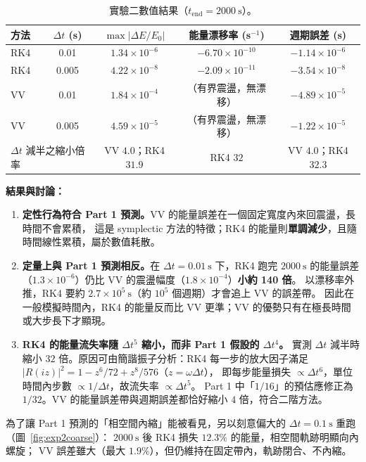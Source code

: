 \documentclass[11pt,a4paper]{article}
\newcommand{\dt}{\Delta t}
\begin{document}
\begin{table}[H]
\centering
\caption{實驗二數值結果（$t_{\text{end}}=2000~\mathrm{s}$）。}
\begin{tabular}{lcccc}
\toprule
方法 & $\dt$ (s) & $\max|\Delta E/E_0|$ & 能量漂移率 (s$^{-1}$) & 週期誤差 (s) \\
\midrule
RK4 & 0.01  & $1.34\times10^{-6}$ & $-6.70\times10^{-10}$ & $-1.14\times10^{-6}$ \\
RK4 & 0.005 & $4.22\times10^{-8}$ & $-2.09\times10^{-11}$ & $-3.54\times10^{-8}$ \\
VV  & 0.01  & $1.84\times10^{-4}$ & （有界震盪，無漂移） & $-4.89\times10^{-5}$ \\
VV  & 0.005 & $4.59\times10^{-5}$ & （有界震盪，無漂移） & $-1.22\times10^{-5}$ \\
\midrule
\multicolumn{2}{l}{$\dt$ 減半之縮小倍率} & VV $4.0$；RK4 $31.9$ & RK4 $32$ & VV $4.0$；RK4 $32.3$ \\
\bottomrule
\end{tabular}
\label{tab:exp2}
\end{table}

\textbf{結果與討論：}
\begin{enumerate}
  \item \textbf{定性行為符合 Part 1 預測。}VV 的能量誤差在一個固定寬度內來回震盪，長時間不會累積，
        這是 symplectic 方法的特徵；RK4 的能量則\textbf{單調減少}，且隨時間線性累積，屬於數值耗散。
  \item \textbf{定量上與 Part 1 預測相反。}在 $\dt=0.01~\mathrm{s}$ 下，RK4 跑完 $2000~\mathrm{s}$ 的能量誤差
        （$1.3\times10^{-6}$）仍比 VV 的震盪幅度（$1.8\times10^{-4}$）\textbf{小約 140 倍}。
        以漂移率外推，RK4 要約 $2.7\times10^{5}~\mathrm{s}$（約 $10^5$ 個週期）才會追上 VV 的誤差帶。
        因此在一般模擬時間內，RK4 的能量反而比 VV 更準；VV 的優勢只有在極長時間或大步長下才顯現。
  \item \textbf{RK4 的能量流失率隨 $\dt^5$ 縮小，而非 Part 1 假設的 $\dt^4$。}
        實測 $\dt$ 減半時縮小 $32$ 倍。原因可由簡諧振子分析：RK4 每一步的放大因子滿足
        $|R(i z)|^2 = 1 - z^6/72 + z^8/576$（$z=\omega\dt$），
        即每步能量損失 $\propto \dt^6$，單位時間內步數 $\propto 1/\dt$，故流失率 $\propto \dt^5$。
        Part 1 中「$1/16$」的預估應修正為 $1/32$。VV 的能量誤差帶與週期誤差都恰好縮小 $4$ 倍，符合二階方法。
\end{enumerate}

為了讓 Part 1 預測的「相空間內縮」能被看見，另以刻意偏大的 $\dt=0.1~\mathrm{s}$ 重跑（圖~\ref{fig:exp2coarse}）：
$2000~\mathrm{s}$ 後 RK4 損失 $12.3\%$ 的能量，相空間軌跡明顯向內螺旋；
VV 誤差雖大（最大 $1.9\%$），但仍維持在固定帶內，軌跡閉合、不內縮。
\end{document}
